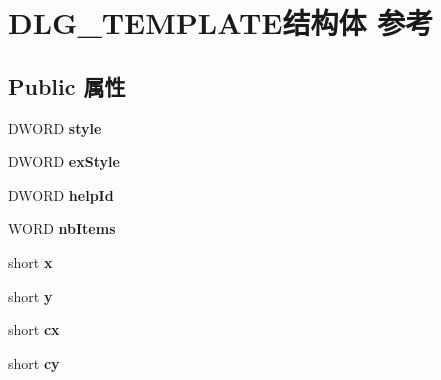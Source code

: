 \hypertarget{struct_d_l_g___t_e_m_p_l_a_t_e}{}\section{D\+L\+G\+\_\+\+T\+E\+M\+P\+L\+A\+T\+E结构体 参考}
\label{struct_d_l_g___t_e_m_p_l_a_t_e}
\subsection*{Public 属性}
\begin{DoxyCompactItemize}
\item 
\mbox{\label{struct_d_l_g___t_e_m_p_l_a_t_e_a47ed8782b5ea1c181a7f7454ea1d039b}} 
D\+W\+O\+RD {\bfseries style}
\item 
\mbox{\label{struct_d_l_g___t_e_m_p_l_a_t_e_a613cb62f6fa7d8397375e80dbb515f2b}} 
D\+W\+O\+RD {\bfseries ex\+Style}
\item 
\mbox{\label{struct_d_l_g___t_e_m_p_l_a_t_e_aff8616be1c2b24ddf05955e694003ea8}} 
D\+W\+O\+RD {\bfseries help\+Id}
\item 
\mbox{\label{struct_d_l_g___t_e_m_p_l_a_t_e_a389507c058248e18455f388137d5a77d}} 
W\+O\+RD {\bfseries nb\+Items}
\item 
\mbox{\label{struct_d_l_g___t_e_m_p_l_a_t_e_a585006a8f8a3431f6a51bb263ba68ce1}} 
short {\bfseries x}
\item 
\mbox{\label{struct_d_l_g___t_e_m_p_l_a_t_e_abdaf2e4b411e0c56e06fcb96346a7a90}} 
short {\bfseries y}
\item 
\mbox{\label{struct_d_l_g___t_e_m_p_l_a_t_e_a2ca4645221c1bbb67a623fd1bed513b9}} 
short {\bfseries cx}
\item 
\mbox{\label{struct_d_l_g___t_e_m_p_l_a_t_e_a651aa6e4a9de3b334e4efd19b4fa3b59}} 
short {\bfseries cy}
\item 
\mbox{\label{struct_d_l_g___t_e_m_p_l_a_t_e_ae0b4e6232e8c52dd669769770a8ff554}} 

\end{DoxyCompactItemize}

